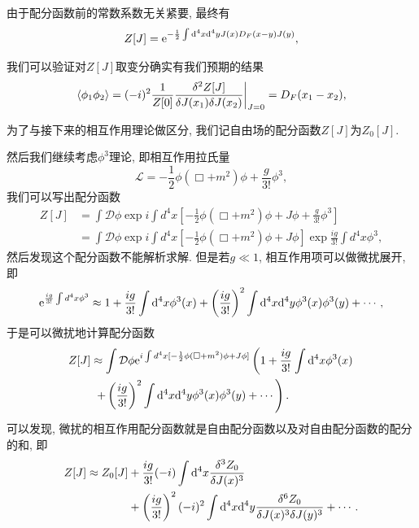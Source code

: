 由于配分函数前的常数系数无关紧要, 最终有
\begin{equation}
    Z[J]=\mathrm e^{-\frac12\int\mathrm d^4x\mathrm d^4y J(x)D_F(x-y)J(y)},
\end{equation}

我们可以验证对$Z[J]$取变分确实有我们预期的结果
\begin{equation}
    \braket{\phi_1\phi_2}=(-i)^2\frac1{Z[0]}\frac{\delta^2 Z[J]}{\delta J(x_1)\delta J(x_2)}\bigg|_{J=0}=D_F(x_1-x_2),
\end{equation}

为了与接下来的相互作用理论做区分, 我们记自由场的配分函数$Z[J]$为$Z_0[J]$. 

然后我们继续考虑$\phi^3$理论, 即相互作用拉氏量
\begin{equation}
    \mathcal L=-\frac12\phi(\Box+m^2)\phi+\frac{g}{3!}\phi^3,
\end{equation}
我们可以写出配分函数
\begin{align}
    Z[J]&=\int\mathcal D\phi \exp{i\int d^4x[-\frac12\phi(\Box+m^2)\phi+J\phi+\frac g{3!}\phi^3]}\\
    &=\int\mathcal D\phi \exp{i\int d^4x[-\frac12\phi(\Box+m^2)\phi+J\phi]}\exp{\frac{ig}{3!}\int d^4x\phi^3},
\end{align}
然后发现这个配分函数不能解析求解. 但是若$g\ll1$, 相互作用项可以做微扰展开, 即
\begin{equation}
    \mathrm e^{\frac{ig}{3!}\int d^4x\phi^3}\approx1+\frac{ig}{3!}\int\mathrm d^4x\phi^3(x)+\left(\frac{ig}{3!}\right)^2\int\mathrm d^4x\mathrm d^4y\phi^3(x)\phi^3(y)+\cdots,
\end{equation}
于是可以微扰地计算配分函数
\begin{align}
    Z[J]&\approx\int\mathcal D\phi \mathrm e^{i\int d^4x[-\frac12\phi(\Box+m^2)\phi+J\phi]}\left(1+{\frac{ig}{3!}}^{}\int\mathrm d^4x\phi^3(x)\right.\notag\\
    &\left.\;+\left(\frac{ig}{3!}\right)^2\int\mathrm d^4x\mathrm d^4y\phi^3(x)\phi^3(y)+\cdots\right).
\end{align}
可以发现, 微扰的相互作用配分函数就是自由配分函数以及对自由配分函数的配分的和, 即
\begin{align}
    Z[J]\approx Z_0[J]&+\frac{ig}{3!}(-i)\int\mathrm d^4x\frac{\delta^3 Z_0}{\delta J(x)^3}\notag\\
    &+\left(\frac{ig}{3!}\right)^2(-i)^2\int\mathrm d^4x\mathrm d^4y\frac{\delta^6 Z_0}{\delta J(x)^3 \delta J(y)^3}+\cdots.
\end{align}



